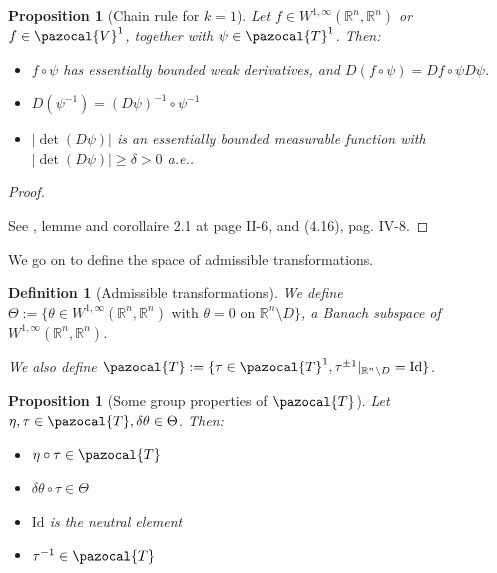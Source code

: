 \documentclass[english,a4paper,10pt,oneside]{scrbook}	%
\theoremstyle{break}
\newtheorem{defn}[equation]{Definition}
\newtheorem{prop}[equation]{Proposition}
\newenvironment{mproof}[1][\proofname]{%
  \begin{proof}[#1]$ $\par\nobreak\ignorespaces
}{%
  \end{proof}
}
\renewcommand*{\proofname}{Proof}
\theoremstyle{remark}
\newcommand{\mR}{\mathbb{R}}
\newcommand{\cV}{\pazocal{V}}
\newcommand{\cT}{\pazocal{T}}
\newcommand{\id}{\text{Id}}
\newcommand{\te}{\theta}
\newcommand{\Te}{\Theta}
\begin{document}
\begin{appendices}
\begin{prop}[Chain rule for $k=1$]
\label{prop:chain}
Let $f \in W^{1,\infty}(\mR^n,\mR^n)$ or $f \in \cV^1$, together with $\psi \in \cT^1$.  Then:

\begin{itemize}

\item $f \circ \psi$ has essentially bounded weak derivatives, and $D(f \circ \psi) = Df \circ \psi D\psi$.

\item  $D(\psi^{-1}) = (D\psi)^{-1} \circ \psi^{-1}$

\item $|\det(D\psi)|$ is an essentially bounded measurable function with $|\det(D\psi)|\geq \delta>0$ a.e.. 
\end{itemize} 

\end{prop}
\begin{mproof}
See \cite{murat}, lemme and corollaire 2.1 at page II-6, and (4.16), pag. IV-8.
\end{mproof}

We go on to define the space of admissible transformations.

\begin{defn}[Admissible transformations]
\label{def:adm}
We define $\Theta:=\{\theta \in W^{1,\infty}(\mR^n,\mR^n) \text{ with } \theta=0 \text{ on } \mR^n \setminus D\}$, a Banach subspace of $ W^{1,\infty}(\mR^n,\mR^n)$.


We also define $\cT:=\{\tau \in \cT^1, \tau^{\pm 1}|_{\mR^n\setminus D}=\id\}$. 

\end{defn}

\begin{prop}[Some group properties of $\cT$]
\label{prop:group}
Let $\eta, \tau \in \cT, \delta \te \in \Te$. Then:

\begin{itemize}
	\item $\eta \circ \tau \in \cT$
	\item $\delta \te \circ \tau \in \Te$
	\item $\id$ is the neutral element
	\item $\tau^{-1} \in \cT$
\end{itemize}


\end{prop}
\end{appendices}
\end{document}
